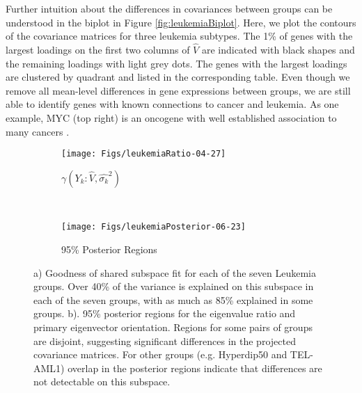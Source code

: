 \documentclass[12pt]{article}
\begin{document}
Further intuition about the differences in covariances between groups
can be understood in the biplot in Figure \ref{fig:leukemiaBiplot}.
Here, we plot the contours of the covariance matrices for three
leukemia subtypes. The 1\% of genes with the largest loadings on the
first two columns of $\hat{V}$ are indicated with black shapes and the
remaining loadings with light grey dots.  The genes with the largest
loadings are clustered by quadrant and listed in the corresponding
table.  Even though we remove all mean-level differences in gene
expressions between groups, we are still able to identify genes with
known connections to cancer and leukemia.  As one example, MYC (top
right) is an oncogene with well established association to many
cancers \citep{Dang2012}.

\begin{figure}[t]
    \centering
    \begin{subfigure}[b]{0.45\textwidth}
        \texttt{[image: Figs/leukemiaRatio-04-27]}
        \caption{$\gamma(Y_k: \hat{V}, \hat{\sigma_k}^2)$}
        \label{fig:leukemiaRatio}
    \end{subfigure}
    ~ %
    \begin{subfigure}[b]{0.45\textwidth}
        \texttt{[image: Figs/leukemiaPosterior-06-23]}
        \caption{95\% Posterior Regions }
        \label{fig:leukemiaPosterior}
    \end{subfigure}
    \caption{a) Goodness of shared subspace fit for each of the seven
      Leukemia groups.  Over 40\% of the variance is explained on this
      subspace in each of the seven groups, with as much as 85\%
      explained in some groups.  b).  95\% posterior regions for the
      eigenvalue ratio and primary eigenvector orientation.  Regions
      for some pairs of groups are disjoint, suggesting significant
      differences in the projected covariance matrices.  For other
      groups (e.g. Hyperdip50 and TEL-AML1) overlap in the posterior
      regions indicate that differences are not detectable on this subspace. }
\label{fig:leukemia}
\end{figure}
\end{document}
